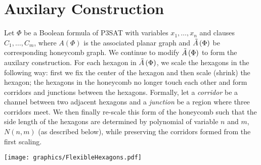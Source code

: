 \section{Auxilary Construction}\label{sec:auxiliaryConstruction}
Let $\Phi$ be a Boolean formula of P3SAT with variables $x_1,\ldots , x_n$ and clauses $C_1,\ldots ,C_m$, where $A(\Phi)$ is the associated planar graph and $\tilde{A}\left( \Phi \right)$ be corresponding honeycomb graph.
We continue to modify $\tilde{A}\left( \Phi \right)$ to form the auxilary construction.   
For each hexagon in $\tilde{A}\left( \Phi \right)$, we scale the hexagons in the following way: first we fix the center of the hexagon and then scale (shrink) the hexagon; the hexagons in the honeycomb no longer touch each other and form corridors and junctions between the hexagons. 
Formally, let a \textit{corridor} be a channel between two adjacent hexagons and a \textit{junction} be a region where three corridors meet.
We then finally re-scale this form of the honeycomb such that the side length of the hexagons are determined by polynomial of variable $n$ and $m$, $N(n,m)$ (as described below), while preserving the corridors formed from the first scaling.\newline

\begin{minipage}{\linewidth}
\begin{center}
\texttt{[image: graphics/FlexibleHexagons.pdf]}
\label{fig:HoneycombFlixible.pdf}
\end{center}
\end{minipage}

